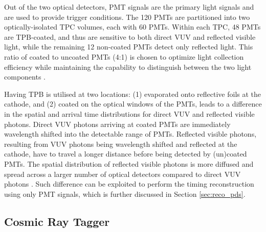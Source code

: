 Out of the two optical detectors, PMT signals are the primary light signals and are used to provide trigger conditions.
The 120 PMTs are partitioned into two optically-isolated TPC volumes, each with 60 PMTs.
Within each TPC, 48 PMTs are TPB-coated, and thus are sensitive to both direct VUV and reflected visible light, while the remaining 12 non-coated PMTs detect only reflected light. 
This ratio of coated to uncoated PMTs (4:1) is chosen to optimize light collection efficiency while maintaining the capability to distinguish between the two light components \cite{sbnd_pds_paper}. 

Having TPB is utilised at two locations: (1) evaporated onto reflective foils at the cathode, and (2) coated on the optical windows of the PMTs, leads to a difference in the spatial and arrival time distributions for direct VUV and reflected visible photons.
Direct VUV photons arriving at coated PMTs are immediately wavelength shifted into the detectable range of PMTs.
Reflected visible photons, resulting from VUV photons being wavelength shifted and reflected at the cathode, have to travel a longer distance before being detected by (un)coated PMTs.
The spatial distribution of reflected visible photons is more diffused and spread across a larger number of optical detectors compared to direct VUV photons \cite{PatrickPhD}.
Such difference can be exploited to perform the timing reconstruction using only PMT signals, which is further discussed in Section \ref{sec:reco_pds}.

\subsection{Cosmic Ray Tagger}
\label{sec:sbnd_crt}

